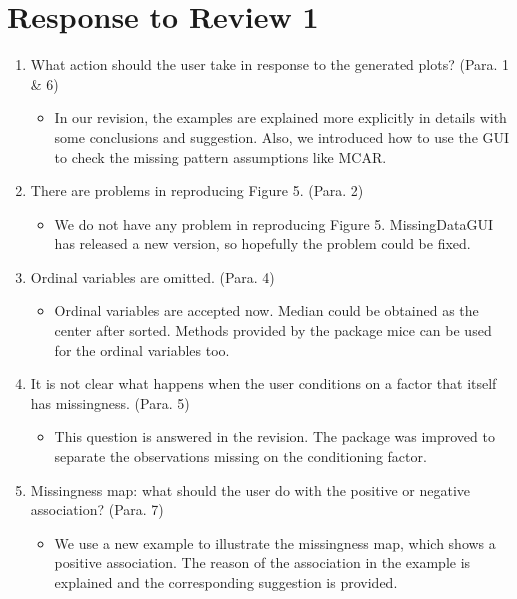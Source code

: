 \documentclass[12pt,english]{article}
\begin{document}
\section*{Response to Review 1}
\begin{enumerate}

\item What action should the user take in response to the generated plots?
(Para. 1 \& 6)
\begin{itemize}
\item In our revision, the examples are explained more explicitly in details
with some conclusions and suggestion. Also, we introduced how to use
the GUI to check the missing pattern assumptions like MCAR.
\end{itemize}

\item There are problems in reproducing Figure 5. (Para. 2)
\begin{itemize}
\item We do not have any problem in reproducing Figure 5. MissingDataGUI
has released a new version, so hopefully the problem could be fixed.
\end{itemize}

\item Ordinal variables are omitted. (Para. 4)
\begin{itemize}
\item Ordinal variables are accepted now. Median could be obtained as the
center after sorted. Methods provided by the package mice can be used
for the ordinal variables too.
\end{itemize}

\item It is not clear what happens when the user conditions on a factor
that itself has missingness. (Para. 5)
\begin{itemize}
\item This question is answered in the revision. The package was improved
to separate the observations missing on the conditioning factor.
\end{itemize}

\item Missingness map: what should the user do with the positive or negative
association? (Para. 7)
\begin{itemize}
\item We use a new example to illustrate the missingness map, which shows
a positive association. The reason of the association in the example
is explained and the corresponding suggestion is provided.
\end{itemize}


\end{enumerate}
\end{document}
